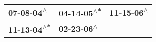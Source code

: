 \begin{supertabular}{lll}
  \textbf{07-08-04\textsuperscript{$\wedge$}} &  \textbf{04-14-05\textsuperscript{$\wedge$*}} &  \textbf{11-15-06\textsuperscript{$\wedge$}} \\
 \textbf{11-13-04\textsuperscript{$\wedge$*}} &   \textbf{02-23-06\textsuperscript{$\wedge$}} &                                              \\
\end{supertabular}
